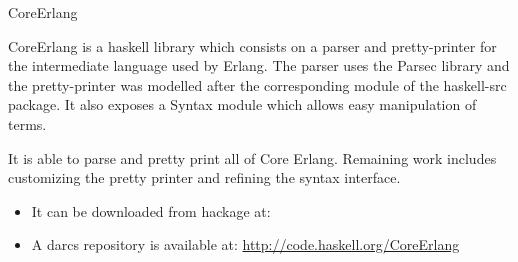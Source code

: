 \documentclass{article}
\begin{document}
\begin{hcarentry}{CoreErlang}
\makeheader

CoreErlang is a haskell library which consists on a parser and
pretty-printer for the intermediate language used by Erlang. The parser uses
the Parsec library and the pretty-printer was modelled after the
corresponding module of the haskell-src package. It also exposes a Syntax
module which allows easy manipulation of terms.

It is able to parse and pretty print all of Core Erlang. Remaining work
includes customizing the pretty printer and refining the syntax interface.

\FurtherReading

\begin{itemize}
\item It can be downloaded from hackage at: 
\item A darcs repository is available at: \url{http://code.haskell.org/CoreErlang}
\end{itemize}

\end{hcarentry}
\end{document}
